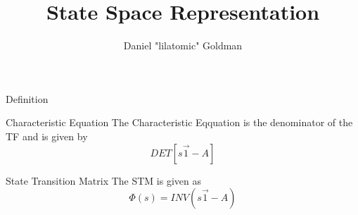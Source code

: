\documentclass{../templates/topic}
\title{State Space Representation}
\author{Daniel "lilatomic" Goldman}
\begin{document}
\maketitle

\begin{section}{Definition}
\end{section}

\begin{section}{Characteristic Equation}
	The Characteristic Eqquation is the denominator of the TF and is given by
	\begin{equation}
		DET[s\vec1-A]
	\end{equation}
\end{section}

\begin{section}{State Transition Matrix}
	The STM is given as
	\begin{equation}
		\Phi(s)=INV(s\vec{1}-A)
	\end{equation}
\end{section}
\end{document}
